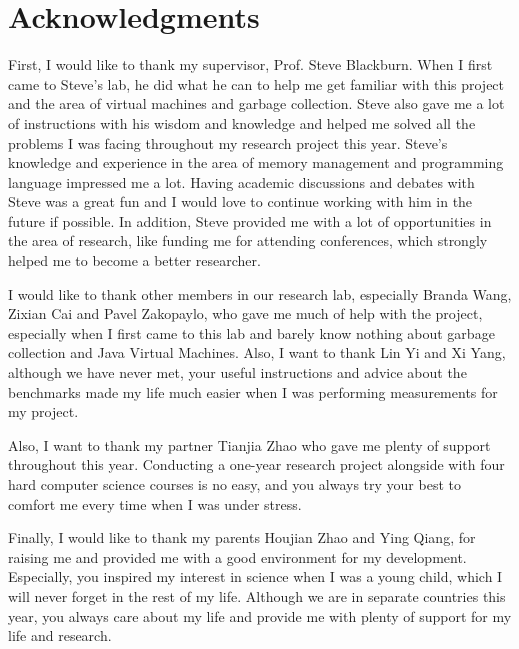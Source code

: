 \chapter*{Acknowledgments}

First, I would like to thank my supervisor, Prof. Steve Blackburn.
When I first came to Steve's lab, he did what he can to help me get familiar with
this project and the area of virtual machines and garbage collection.
Steve also gave me a lot of instructions with his wisdom and knowledge
and helped me solved all the problems I was facing throughout my research project this year.
Steve's knowledge and experience in the area of memory management and
programming language impressed me a lot.
Having academic discussions and debates with Steve was a great fun and
I would love to continue working with him in the future if possible.
In addition, Steve provided me with a lot of opportunities in the area of research,
like funding me for attending conferences, which strongly helped me to become a better researcher.

I would like to thank other members in our research lab, especially
Branda Wang, Zixian Cai and Pavel Zakopaylo, who gave me much of help
with the project,  especially when I first came to this lab and barely know nothing
about garbage collection and Java Virtual Machines.
Also, I want to thank Lin Yi and Xi Yang, although we have never met, your useful
instructions and advice about the benchmarks made my life much easier when I was
performing measurements for my project.

Also, I want to thank my partner Tianjia Zhao who gave me plenty of support throughout this year.
Conducting a one-year research project alongside with four hard computer science courses is no easy,
and you always try your best to comfort me every time when I was under stress.

Finally, I would like to thank my parents Houjian Zhao and Ying Qiang, 
for raising me and provided me with a good environment for my development.
Especially, you inspired my interest in science when I was a young child,
which I will never forget in the rest of my life.
Although we are in separate countries this year,
you always care about my life and provide me with plenty of support for my life and research.

